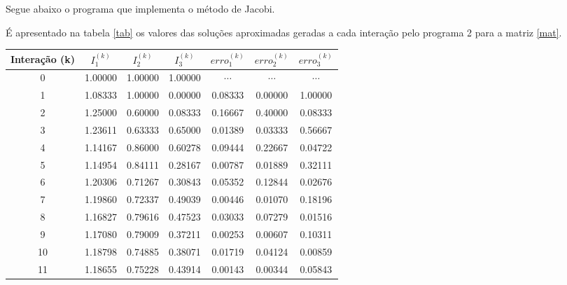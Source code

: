 \documentclass[a4paper,11pt, twoside]{article}
\newcommand{\n}[1]{\textbf{#1}}
\begin{document}
    Segue abaixo o programa que implementa o método de Jacobi.
    
    {\linespread{1.15}
    }
    
    É apresentado na tabela \ref{tab} os valores das soluções aproximadas geradas a cada interação pelo programa 2 para a matriz \eqref{mat}.
    
    {\linespread{1}
    \begin{table}[!th]
        \begin{center}
            \begin{tabular}{ c c c c c c c }
                \toprule[0.11em]
                \n{Interação (k)} & \n{$I_1^{(k)}$} & \n{$I_2^{(k)}$} & \n{$I_3^{(k)}$} & \n{$erro_1^{(k)}$} & \n{$erro_2^{(k)}$} & \n{$erro_3^{(k)}$}\\
                \toprule[0.11em]
                0 & 1.00000 & 1.00000 & 1.00000 & $\cdots$  &  $\cdots$  &  $\cdots$ \\
                \midrule
                1 & 1.08333 & 1.00000 & 0.00000 & 0.08333  & 0.00000  & 1.00000 \\
                \midrule
                2 & 1.25000 & 0.60000 & 0.08333 & 0.16667  & 0.40000  & 0.08333 \\
                \midrule
                3 & 1.23611 & 0.63333 & 0.65000 & 0.01389  & 0.03333  & 0.56667 \\
                \midrule
                4 & 1.14167 & 0.86000 & 0.60278 & 0.09444  & 0.22667  & 0.04722 \\
                \midrule
                5 & 1.14954 & 0.84111 & 0.28167 & 0.00787  & 0.01889  & 0.32111 \\
                \midrule
                6 & 1.20306 & 0.71267 & 0.30843 & 0.05352  & 0.12844  & 0.02676 \\
                \midrule
                7 & 1.19860 & 0.72337 & 0.49039 & 0.00446  & 0.01070  & 0.18196 \\
                \midrule
                8 & 1.16827 & 0.79616 & 0.47523 & 0.03033  & 0.07279  & 0.01516 \\
                \midrule
                9 & 1.17080 & 0.79009 & 0.37211 & 0.00253  & 0.00607  & 0.10311 \\
                \midrule
                10 & 1.18798 & 0.74885 & 0.38071 & 0.01719  & 0.04124  & 0.00859 \\
                \midrule
                11 & 1.18655 & 0.75228 & 0.43914 & 0.00143  & 0.00344  & 0.05843 \\

\end{tabular}
\end{center}
\end{table}}
\end{document}
